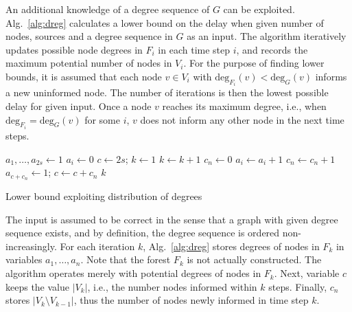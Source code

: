 An additional knowledge of a degree sequence of $G$ can be exploited. 
Alg.~\ref{alg:dreg} calculates a lower bound on the delay when given number of nodes, sources and a degree sequence in $G$ as an input.
The algorithm iteratively updates possible node degrees in $F_i$ in each time step $i$, and records the maximum potential number of nodes in $V_i$.
For the purpose of finding lower bounds, it is assumed that each node $v\in V_i$ with $\text{deg}_{F_i}(v)<\text{deg}_G(v)$ informs a new uninformed node.
The number of iterations is then the lowest possible delay for given input.
Once a node $v$ reaches its maximum degree, i.e., when $\text{deg}_{F_i}=\text{deg}_G(v)$ for some $i$, $v$ does not inform any other node in the next time steps.


\begin{algorithm}
$a_1,\dots,a_{2s}\leftarrow 1$\;%
 {
$a_i\leftarrow 0$\;
}
$c\leftarrow 2s$;
$k\leftarrow 1$\;
 {
$k\leftarrow k+1$\;
$c_n\leftarrow 0$\;
 {
	 {
		$a_i\leftarrow a_i + 1$\;
		$c_n\leftarrow c_n + 1$\;
		 {
			$a_{c+c_n}\leftarrow 1$; 
		}
	}
}
$c\leftarrow c + c_n$\;
}
\Return $k$\;
 \caption{Lower bound exploiting distribution of degrees}
\label{alg:dreg}
\end{algorithm}


The input is assumed to be correct in the sense that a graph with given degree sequence exists, and by definition, the degree sequence is ordered non-increasingly.
For each iteration $k$, Alg.~\ref{alg:dreg} stores degrees of nodes in $F_k$ in variables $a_1,\dots,a_n$.
Note that the forest $F_k$ is not actually constructed. 
The algorithm operates merely with potential degrees of nodes in $F_k$.
Next, variable $c$ keeps the value $|V_k|$, i.e., the number nodes informed within $k$ steps.
Finally, $c_n$ stores $|V_k\setminus V_{k-1}|$, thus the number of nodes newly informed in time step $k$.


